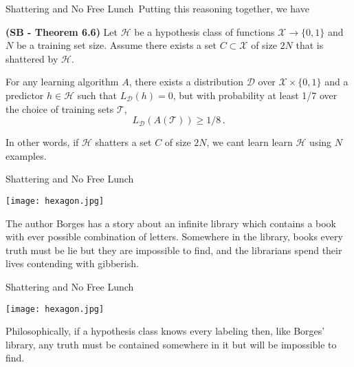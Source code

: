 \documentclass[10pt, table, dvipsnames, handout]{beamer}
\newcommand{\cT}{\ensuremath{\mathcal{T}}}
\newcommand{\cD}{\ensuremath{\mathcal{D}}}
\newcommand{\cX}{\ensuremath{\mathcal{X}}}
\newcommand{\cH}{\ensuremath{\mathcal{H}}}
\begin{document}
\begin{frame}[fragile]{Shattering and No Free Lunch}\
Putting this reasoning together, we have

\textbf{(SB - Theorem 6.6)} Let $\cH$ be a hypothesis class of functions $\cX\to\{0,1\}$ and $N$ be a training set size. \pause Assume there exists a set $C\subset \cX$ of size $2N$ that is shattered by $\cH$. \pause 

For any learning algorithm $A$,  there exists a distribution $\cD$ over $\cX\times\{0,1\}$ and a predictor $h\in \cH$ such that $L_\cD(h) = 0$, but with probability at least 1/7 over the choice of training sets $\cT$, 
$$
L_\cD(A(\cT))\geq 1/8\,.
$$\pause

In other words, if $\cH$ shatters a set $C$ of size $2N$, we cant learn learn $\cH$ using $N$ examples. 


\end{frame}



\begin{frame}[fragile]{Shattering and No Free Lunch}
  \begin{minipage}[t][0.6\textheight][t]{\textwidth}
	\centering \texttt{[image: hexagon.jpg]} 
  \end{minipage}
  \vfill
  \begin{minipage}[t][0.4\textheight][t]{\textwidth}
  
The author Borges has a story about an infinite library which contains a book with ever possible combination of letters. Somewhere in the library, books every truth must be lie but they are impossible to find, and the librarians spend their lives contending with gibberish. 
\end{minipage}
\end{frame}



\begin{frame}[fragile]{Shattering and No Free Lunch}
  \begin{minipage}[t][0.6\textheight][t]{\textwidth}
	\centering \texttt{[image: hexagon.jpg]} 
  \end{minipage}
  \vfill
  \begin{minipage}[t][0.4\textheight][t]{\textwidth}
  
Philosophically, if a hypothesis class knows every labeling then, like Borges' library, any truth must be contained somewhere in it but will be impossible to find.
\end{minipage}
\end{frame}
\end{document}

